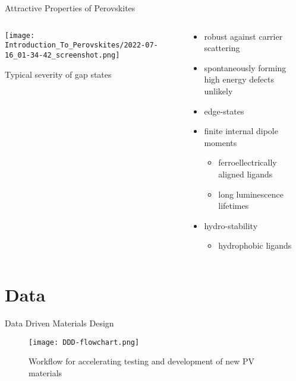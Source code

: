 \documentclass[10pt, aspectratio=169, presentation]{beamer}
\begin{document}
\begin{frame}[label={sec:org94c6e6e}]{Attractive Properties of Perovskites}
\begin{columns}
\begin{column}{0.5\columnwidth}
\begin{center}
\texttt{[image: Introduction\_To\_Perovskites/2022-07-16\_01-34-42\_screenshot.png]}
\end{center}
Typical severity of gap states
\autocite{mannodi-kanakkithodi-2020-defec-energ}
\end{column}

\begin{column}{0.5\columnwidth}
\begin{itemize}
\item robust against carrier scattering
\autocite{yan-2016-defec-physic}
\item spontaneously forming high energy defects unlikely
\item edge-states
\item finite internal dipole moments
\autocite{hong-2021-layer-edge}
\begin{itemize}
\item ferroellectrically aligned ligands
\item long luminescence lifetimes
\end{itemize}
\item hydro-stability
\autocite{fu-2021-two-dimen}
\begin{itemize}
\item hydrophobic ligands
\end{itemize}
\end{itemize}
\end{column}
\end{columns}
\end{frame}

\section{Data}
\label{sec:org19b4039}
\begin{frame}[label={sec:org1332dad}]{Data Driven Materials Design}
\begin{figure}[htbp]
\centering
\texttt{[image: DDD-flowchart.png]}
\caption{Workflow for accelerating testing and development of new PV materials\autocite{yang-2023-high-throug,pablo-2019-new-front}}
\end{figure}
\end{frame}
\end{document}
